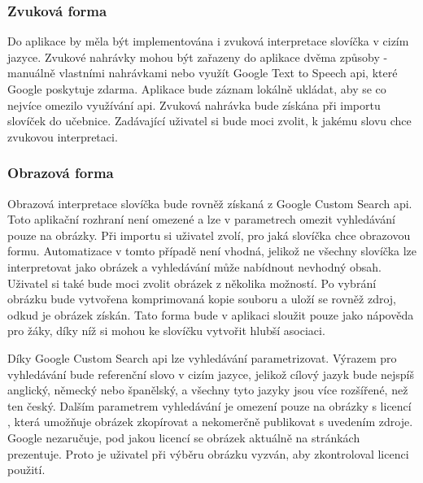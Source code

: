 \documentclass[a4paper,11pt,titlepage,fleqn]{article}
\begin{document}
        \subsubsection{Zvuková forma}
            Do aplikace by měla být implementována i zvuková interpretace slovíčka v cizím jazyce. Zvukové nahrávky mohou být zařazeny do aplikace dvěma způsoby - manuálně vlastními nahrávkami nebo využít Google Text to Speech \gls{api}, které Google poskytuje zdarma. Aplikace bude záznam lokálně ukládat, aby se co nejvíce omezilo využívání \gls{api}. Zvuková nahrávka bude získána při importu slovíček do učebnice. Zadávající uživatel si bude moci zvolit, k jakému slovu chce zvukovou interpretaci.

        \subsubsection{Obrazová forma}
            Obrazová interpretace slovíčka bude rovněž získaná z Google Custom Search \gls{api}. Toto aplikační rozhraní není omezené a lze v parametrech omezit vyhledávání pouze na obrázky. Při importu si uživatel zvolí, pro jaká slovíčka chce obrazovou formu. Automatizace v tomto případě není vhodná, jelikož ne všechny slovíčka lze interpretovat jako obrázek a vyhledávání může nabídnout nevhodný obsah. Uživatel si také bude moci zvolit obrázek z několika možností. Po vybrání obrázku bude vytvořena komprimovaná kopie souboru a uloží se rovněž zdroj, odkud je obrázek získán. Tato forma bude v aplikaci sloužit pouze jako nápověda pro žáky, díky níž si mohou ke slovíčku vytvořit hlubší asociaci. 

            Díky Google Custom Search \gls{api} lze vyhledávání parametrizovat. Výrazem pro vyhledávání bude referenční slovo v cizím jazyce, jelikož cílový jazyk bude nejspíš anglický, německý nebo španělský, a všechny tyto jazyky jsou více rozšířené, než ten český. Dalším parametrem vyhledávání je omezení pouze na obrázky s licencí , která umožňuje obrázek zkopírovat a nekomerčně publikovat s uvedením zdroje. Google nezaručuje, pod jakou licencí se obrázek aktuálně na stránkách prezentuje. Proto je uživatel při výběru obrázku vyzván, aby zkontroloval licenci použití.
\end{document}
